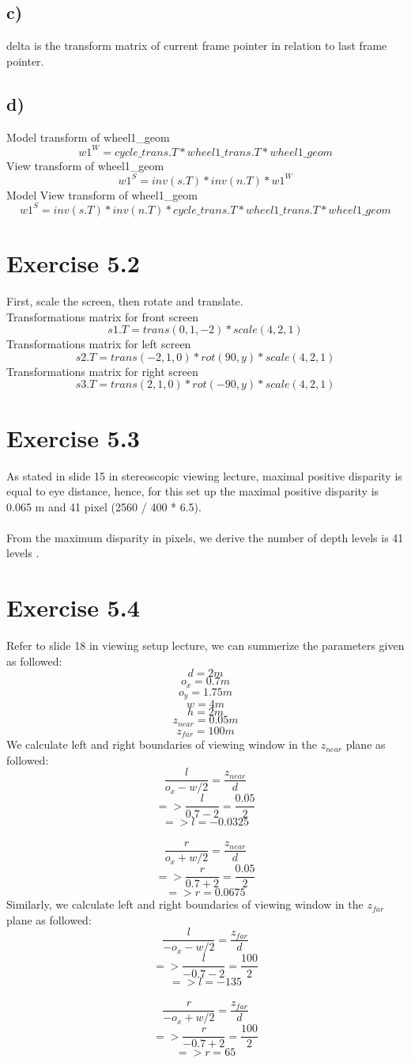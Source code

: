 \documentclass[12pt]{article}
\begin{document}
\subsection*{c)}
delta is the transform matrix of current frame pointer in relation to last frame pointer.

\subsection*{d)}
Model transform of wheel1\_geom 
$$w1^W = cycle\_trans.T * wheel1\_trans.T * wheel1\_geom$$
View transform of wheel1\_geom 
$$w1^{S} = inv(s.T) * inv(n.T) * w1^W$$
Model View transform of wheel1\_geom 
$$w1^S = inv(s.T) * inv(n.T) * cycle\_trans.T * wheel1\_trans.T * wheel1\_geom$$

\section*{Exercise 5.2}
First, scale the screen, then rotate and translate.\\
Transformations matrix for front screen 
$$s1.T = trans(0,1,-2) * scale(4,2,1)$$
Transformations matrix for left screen 
$$s2.T = trans(-2,1,0) * rot(90, y) * scale(4,2,1)$$
Transformations matrix for right screen 
$$s3.T = trans(2,1,0) * rot(-90, y) * scale(4,2,1)$$

\section*{Exercise 5.3}
As stated in slide 15 in stereoscopic viewing lecture, maximal positive disparity is equal to eye distance, hence, for this set up the maximal positive disparity is 0.065 m and 41 pixel (2560 / 400 * 6.5).\\\\
From the maximum disparity in pixels, we derive the number of depth levels is 41 levels .

\section*{Exercise 5.4}
Refer to slide 18 in viewing setup lecture, we can summerize the parameters given as followed:
$$d = 2m$$
$$o_x = 0.7m$$
$$o_y = 1.75m$$
$$w = 4m$$
$$h = 2m$$
$$z_{near} = 0.05m$$
$$z_{far} = 100m$$
We calculate left and right boundaries of viewing window in the $z_{near}$ plane as followed:
$$\frac{l}{o_x-w/2} = \frac{z_{near}}{d}$$
$$=>\frac{l}{0.7-2} = \frac{0.05}{2}$$
$$=>l = -0.0325$$\\
$$\frac{r}{o_x+w/2} = \frac{z_{near}}{d}$$
$$=>\frac{r}{0.7+2} = \frac{0.05}{2}$$
$$=>r = 0.0675$$
Similarly, we calculate left and right boundaries of viewing window in the $z_{far}$ plane as followed:
$$\frac{l}{-o_x-w/2} = \frac{z_{far}}{d}$$
$$=>\frac{l}{-0.7-2} = \frac{100}{2}$$
$$=>l = -135$$\\
$$\frac{r}{-o_x+w/2} = \frac{z_{far}}{d}$$
$$=>\frac{r}{-0.7+2} = \frac{100}{2}$$
$$=>r = 65$$
\end{document}
